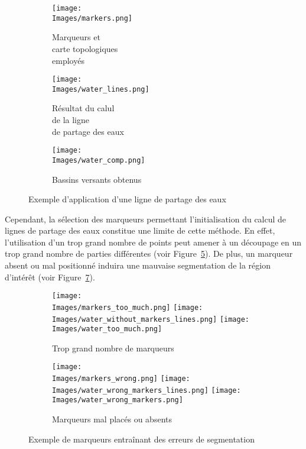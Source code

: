 \documentclass[\main/main.tex]{subfiles}
\providecommand{\Images}{\main/Figures/intro_seg}
\begin{document}
\begin{figure}[h]
    \begin{subfigure}[b]{0.30\textwidth}
       \caption{
           \label{fig:lpe:marqueurs}
            Marqueurs et\\ carte topologiques\\employés
            }
       \centering \texttt{[image: \\Images/markers.png]}
    \end{subfigure}
    \begin{subfigure}[b]{0.30\textwidth}
       \caption{
           \label{fig:lpe:lines}
            Résultat du calul\\ de la ligne\\ de partage des eaux
            }
       \centering \texttt{[image: \\Images/water\_lines.png]}
    \end{subfigure}
    \begin{subfigure}[b]{0.30\textwidth}
       \caption{
           \label{fig:lpe:zones}
            Bassins versants obtenus
            }
       \centering \texttt{[image: \\Images/water\_comp.png]}
    \end{subfigure}
    \caption{
        Exemple d'application d'une ligne de partage des eaux
    }
    
\end{figure}

%
%
Cependant, la sélection des marqueurs permettant l'initialisation du calcul de lignes de partage des eaux constitue une limite de cette méthode.
%
En effet, l'utilisation d'un trop grand nombre de points peut amener à un découpage en un trop grand nombre de parties différentes (voir Figure~\ref{fig:watershed:errors:quantite}).
%
De plus, un marqueur absent ou mal positionné induira une mauvaise segmentation de la région d'intérêt (voir Figure~\ref{fig:watershed:errors:position}).

\begin{figure}[h]
    \begin{subfigure}[b]{\textwidth}
       \caption{
           \label{fig:watershed:errors:quantite}
            Trop grand nombre de marqueurs
            }
       \centering \texttt{[image: \\Images/markers\_too\_much.png]} \texttt{[image: \\Images/water\_without\_markers\_lines.png]}
       \centering \texttt{[image: \\Images/water\_too\_much.png]}
    \end{subfigure}
    \begin{subfigure}[b]{\textwidth}
       \caption{
           \label{fig:watershed:errors:position}
            Marqueurs mal placés ou absents
            }
       \centering \texttt{[image: \\Images/markers\_wrong.png]} \texttt{[image: \\Images/water\_wrong\_markers\_lines.png]}
       \centering \texttt{[image: \\Images/water\_wrong\_markers.png]}
       \centering
    \end{subfigure}
    \caption{
        Exemple de marqueurs entraînant des erreurs de segmentation
    }
    
\end{figure}
\end{document}
